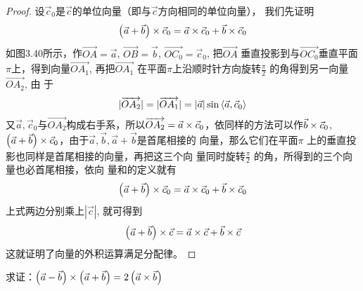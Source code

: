\begin{figure}[htp]
    \centering
{}    
    \caption{}
\end{figure}

\begin{proof}
    设$\vec{c}_0$是$\vec{c}$的单位向量（即与$\vec{c}$方向相同的单位向量），
我们先证明
\[\left(\vec{a}+\vec{b}\right)\times \vec{c}_0=\vec{a}\times \vec{c}_0+\vec{b}\times \vec{c}_0
\]
如图3.40所示，作$\Vec{OA}=\vec{a}$, $\Vec{OB}=\vec{b}$, $\Vec{OC_0}=\vec{c}_0$, 把$\Vec{OA}$
垂直投影到与$\Vec{OC_0}$垂直平面$\pi$上，得到向量$\Vec{OA_1}$, 再把$\Vec{OA_1}$
在平面$\pi$上沿顺时针方向旋转$\frac{\pi}{2}$
的角得到另一向量$\Vec{OA_2}$, 由
于
\[|\overrightarrow{OA_2}|=|\overrightarrow{OA_1}|=|\vec{a}|\sin\left\langle \vec{a},\vec{c}_0 \right\rangle\]
又$\vec{a},\vec{c}_0$与$\Vec{OA_2}$构成右手系，所以$\overrightarrow{OA_2}=\vec{a}\times \vec{c}_0$，依同样的方法可以作$\vec{b}\times \vec{c}_0$, $\left(\vec{a}+\vec{b}\right)\times \vec{c}_0$，由于$\vec{a},\vec{b},\vec{a}+\vec{b}$是首尾相接的
向量，那么它们在平面$\pi$
上的垂直投影也同样是首尾相接的向量，再把这三个向
量同时旋转$\frac{\pi}{2}$
的角，所得到的三个向量也必首尾相接，依向
量和的定义就有
\[\left(\vec{a}+\vec{b}\right)\times \vec{c}_0=\vec{a}\times \vec{c}_0+\vec{b}\times \vec{c}_0
\]
上式两边分别乘上$|\vec{c}|$, 就可得到
\[\left(\vec{a}+\vec{b}\right)\times \vec{c}=\vec{a}\times \vec{c}+\vec{b}\times \vec{c}
\]
这就证明了向量的外积运算满足分配律。
\end{proof}


\begin{example}
      求证：$\left(\vec{a}-\vec{b}\right)\times\left(\vec{a}+\vec{b}\right)=2\left(\vec{a}\times \vec{b}\right)$
\end{example}

